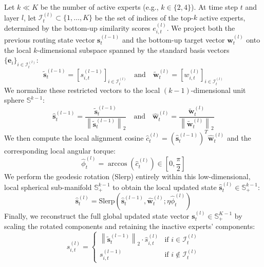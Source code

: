 \documentclass{article}
\theoremstyle{plain}
\theoremstyle{definition}
\theoremstyle{remark}
\begin{document}
Let $k \ll K$ be the number of active experts (e.g., $k \in \{2, 4\}$). At time step $t$ and layer $l$, let $\mathcal{I}_t^{(l)} \subset \{1, \dots, K\}$ be the set of indices of the top-$k$ active experts, determined by the bottom-up similarity scores $e_{i, t}^{(l)}$. We project both the previous routing state vector $\mathbf{s}_t^{(l-1)}$ and the bottom-up target vector $\mathbf{w}_t^{(l)}$ onto the local $k$-dimensional subspace spanned by the standard basis vectors $\{\mathbf{e}_i\}_{i \in \mathcal{I}_t^{(l)}}$:
\begin{equation}
\tilde{\mathbf{s}}_t^{(l-1)} = \left[ s_{i, t}^{(l-1)} \right]_{i \in \mathcal{I}_t^{(l)}} \quad \text{and} \quad \tilde{\mathbf{w}}_t^{(l)} = \left[ w_{i, t}^{(l)} \right]_{i \in \mathcal{I}_t^{(l)}}
\end{equation}
We normalize these restricted vectors to the local $(k-1)$-dimensional unit sphere $\mathbb{S}^{k-1}$:
\begin{equation}
\hat{\mathbf{s}}_t^{(l-1)} = \frac{\tilde{\mathbf{s}}_t^{(l-1)}}{\left\|\tilde{\mathbf{s}}_t^{(l-1)}\right\|_2} \quad \text{and} \quad \hat{\mathbf{w}}_t^{(l)} = \frac{\tilde{\mathbf{w}}_t^{(l)}}{\left\|\tilde{\mathbf{w}}_t^{(l)}\right\|_2}
\end{equation}
We then compute the local alignment cosine $\hat{c}_t^{(l)} = \left(\hat{\mathbf{s}}_t^{(l-1)}\right)^T \hat{\mathbf{w}}_t^{(l)}$ and the corresponding local angular torque:
\begin{equation}
\hat{\phi}_t^{(l)} = \arccos\left(\hat{c}_t^{(l)}\right) \in \left[0, \frac{\pi}{2}\right]
\end{equation}
We perform the geodesic rotation (Slerp) entirely within this low-dimensional, local spherical sub-manifold $\mathbb{S}^{k-1}_+$ to obtain the local updated state $\hat{\mathbf{s}}_t^{(l)} \in \mathbb{S}^{k-1}_+$:
\begin{equation}
\hat{\mathbf{s}}_t^{(l)} = \text{Slerp}\left(\hat{\mathbf{s}}_t^{(l-1)}, \hat{\mathbf{w}}_t^{(l)}; \eta \hat{\phi}_t^{(l)}\right)
\end{equation}
Finally, we reconstruct the full global updated state vector $\mathbf{s}_t^{(l)} \in \mathbb{S}^{K-1}_+$ by scaling the rotated components and retaining the inactive experts' components:
\begin{equation}
s_{i, t}^{(l)} = \begin{cases} \left\|\tilde{\mathbf{s}}_t^{(l-1)}\right\|_2 \cdot \hat{s}_{i, t}^{(l)} & \text{if } i \in \mathcal{I}_t^{(l)} \\ s_{i, t}^{(l-1)} & \text{if } i \notin \mathcal{I}_t^{(l)} \end{cases}
\end{equation}
\end{document}
